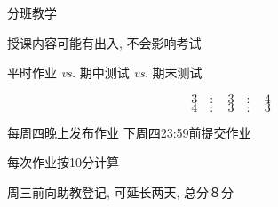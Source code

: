 
\begin{frame}{}
  \begin{center}
    分班教学

    {\large 授课内容可能有出入, 不会影响考试}
  \end{center}
\end{frame}

\begin{frame}{}
  \begin{center}
    {\large 平时作业 {\it vs.} 期中测试 {\it vs.} 期末测试}

    \[
      3 \quad:\quad 3 \quad:\quad 4
    \]
    \[
      4 \quad:\quad 3 \quad:\quad 3
    \]

    \vspace{0.80cm}
  \end{center}
\end{frame}

\begin{frame}{}
\end{frame}

\begin{frame}{}
  \begin{center}
    每周四晚上发布作业 \qquad 下周四23:59前提交作业

    \vspace{0.50cm}
    每次作业按10分计算

    \vspace{0.50cm}
     周三前向助教登记, 可延长两天, 总分８分
  \end{center}
\end{frame}

\begin{frame}{}
  \begin{center}

    \pause
    \vspace{1.50cm}
  \end{center}
\end{frame}

\begin{frame}{}
  \begin{center}


    \pause
    \vspace{1.50cm}
  \end{center}
\end{frame}

